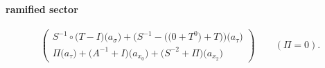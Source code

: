 \paragraph{ramified sector}
\[\begin{pmatrix}S^{-1}\circ \bigl(T-I\bigr)\bigl(a_{\sigma}\bigr)+\bigl(S^{-1}-\bigl(\bigl(0+T^{0}\bigr)+T\bigr)\bigr)\bigl(a_{\tau}\bigr)\\\Pi\bigl(a_{\tau}\bigr)+\bigl(A^{-1}+I\bigr)\bigl(a_{x_{0}}\bigr)+\bigl(S^{-2}+\Pi\bigr)\bigl(a_{x_{2}}\bigr)\end{pmatrix}\qquad(\Pi=0).\]
